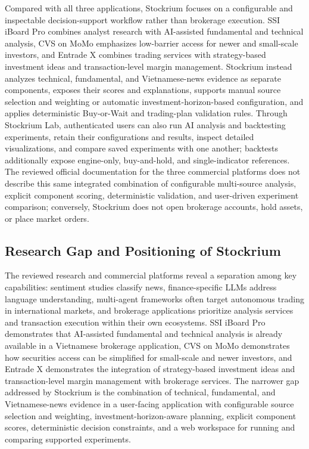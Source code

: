 Compared with all three applications, Stockrium focuses on a configurable and inspectable decision-support workflow rather than brokerage execution. SSI iBoard Pro combines analyst research with AI-assisted fundamental and technical analysis, CVS on MoMo emphasizes low-barrier access for newer and small-scale investors, and Entrade X combines trading services with strategy-based investment ideas and transaction-level margin management. Stockrium instead analyzes technical, fundamental, and Vietnamese-news evidence as separate components, exposes their scores and explanations, supports manual source selection and weighting or automatic investment-horizon-based configuration, and applies deterministic Buy-or-Wait and trading-plan validation rules. Through Stockrium Lab, authenticated users can also run AI analysis and backtesting experiments, retain their configurations and results, inspect detailed visualizations, and compare saved experiments with one another; backtests additionally expose engine-only, buy-and-hold, and single-indicator references. The reviewed official documentation for the three commercial platforms does not describe this same integrated combination of configurable multi-source analysis, explicit component scoring, deterministic validation, and user-driven experiment comparison; conversely, Stockrium does not open brokerage accounts, hold assets, or place market orders.

\subsection{Research Gap and Positioning of Stockrium}

The reviewed research and commercial platforms reveal a separation among key capabilities: sentiment studies classify news, finance-specific LLMs address language understanding, multi-agent frameworks often target autonomous trading in international markets, and brokerage applications prioritize analysis services and transaction execution within their own ecosystems. SSI iBoard Pro demonstrates that AI-assisted fundamental and technical analysis is already available in a Vietnamese brokerage application, CVS on MoMo demonstrates how securities access can be simplified for small-scale and newer investors, and Entrade X demonstrates the integration of strategy-based investment ideas and transaction-level margin management with brokerage services. The narrower gap addressed by Stockrium is the combination of technical, fundamental, and Vietnamese-news evidence in a user-facing application with configurable source selection and weighting, investment-horizon-aware planning, explicit component scores, deterministic decision constraints, and a web workspace for running and comparing supported experiments.

